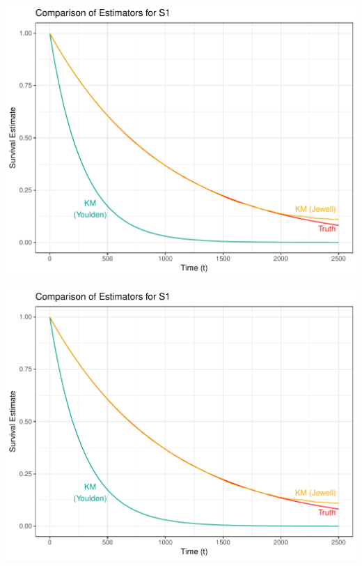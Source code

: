 \documentclass[landscape,a0paper,fontscale=0.285]{baposter} %
\begin{document}
\begin{poster}
{\begin{multicols}{2}
\begin{center}
\vspace*{-0.5cm}
\includegraphics[scale=0.45]{s1_estim_compare}
\vspace{-1.75em}
\end{center}



\begin{center}
\vspace*{-0.8cm}  %
\includegraphics[scale=0.45]{s1_estim_compare}
\vspace{-1.75em}
\end{center}


\end{multicols}}
\end{poster}
\end{document}
